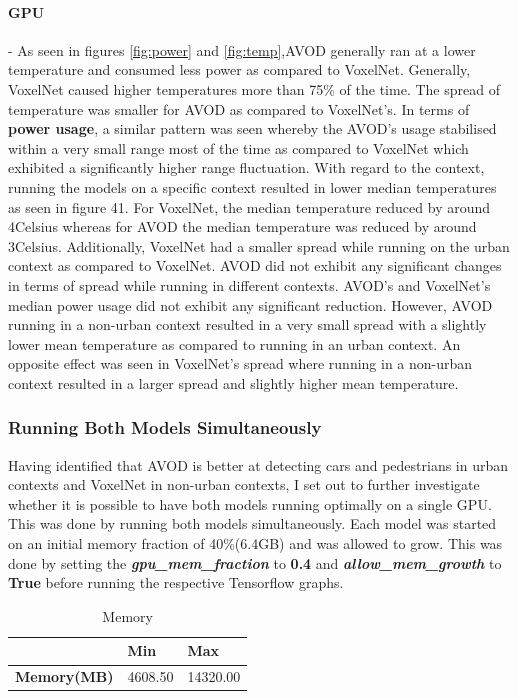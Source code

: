 \paragraph{GPU} - As seen in figures \ref{fig:power} and \ref{fig:temp},AVOD generally ran at a lower temperature and consumed less power as compared to VoxelNet. 
Generally, VoxelNet caused higher temperatures more than 75\% of the time. The spread of temperature was smaller for AVOD as compared to VoxelNet's. 
In terms of \textbf{power usage}, a similar pattern was seen whereby the AVOD's usage stabilised within a very small range most of the time as compared to VoxelNet which exhibited  a significantly higher range fluctuation. 
With regard to the context, running the models on a specific context resulted in lower median temperatures as seen in figure 41. For VoxelNet, the median temperature reduced by around 4\degree Celsius whereas for AVOD the median temperature was reduced by around 3\degree  Celsius. Additionally, VoxelNet had a smaller spread while running on the urban context as compared to VoxelNet. AVOD did not exhibit any significant changes in terms of spread while running in different contexts. AVOD's and VoxelNet's median power usage did not exhibit any significant reduction. However, AVOD running in a non-urban context resulted in a very small spread with a slightly lower mean temperature as compared to running in an urban context. An opposite effect was seen in VoxelNet's spread where running in a non-urban context resulted in a larger spread and slightly higher mean temperature.


\subsubsection*{Running Both Models Simultaneously}
Having identified that AVOD is better at detecting cars and pedestrians in urban contexts and VoxelNet in non-urban contexts, I set out to further investigate whether it is possible to have both models running optimally on a single GPU. This was done by running both models simultaneously. Each model was started on an initial memory fraction of 40\%(6.4GB) and was allowed to grow. This was done by setting the \textit{\textbf{gpu\_mem\_fraction}} to \textbf{0.4} and \textbf{\textit{allow\_mem\_growth}} to \textbf{True} before running the respective Tensorflow graphs. 

\begin{table}[H] %
	\centering
	\caption{Memory}
	\label{tab:mem}
	\begin{tabular}{|l|l|l|}
		\hline
		& \textbf{Min} & \textbf{Max} \\ \hline
		\textbf{Memory(MB)} & 4608.50  & 14320.00\\ \hline
	\end{tabular}
	
\end{table}

